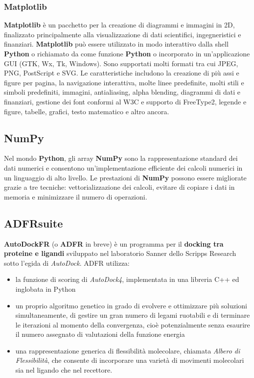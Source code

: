 \subsubsection{Matplotlib}
\textbf{Matplotlib} è un pacchetto per la creazione di diagrammi e immagini in 2D, finalizzato principalmente alla visualizzazione di dati scientifici, ingegneristici e finanziari. \textbf{Matplotlib} può essere utilizzato in modo interattivo dalla shell \textbf{Python} o richiamato da come funzione \textbf{Python} o incorporato in un'applicazione GUI (GTK, Wx, Tk, Windows). Sono supportati molti formati tra cui JPEG, PNG, PostScript e SVG. Le caratteristiche includono la creazione di più assi e figure per pagina, la navigazione interattiva, molte linee predefinite, molti stili e simboli predefiniti, immagini, antialiasing, alpha blending, diagrammi di dati e finanziari, gestione dei font conformi al W3C e supporto di FreeType2, legende e figure, tabelle, grafici, testo matematico e altro ancora\cite{barrett2005matplotlib}.

\subsection{NumPy}
Nel mondo \textbf{Python}, gli array \textbf{NumPy} sono la rappresentazione standard dei dati numerici e consentono un'implementazione efficiente dei calcoli numerici in un linguaggio di alto livello. Le prestazioni di \textbf{NumPy} possono essere migliorate grazie a tre tecniche: vettorializzazione dei calcoli, evitare di copiare i dati in memoria e minimizzare il numero di operazioni\cite{van2011numpy}.

\subsection{ADFRsuite}
\textbf{AutoDockFR} (o \textbf{ADFR} in breve) è un programma per il \textbf{docking tra proteine e ligandi} sviluppato nel laboratorio Sanner dello Scripps Research sotto l'egida di \textit{AutoDock}.\newline
ADFR utilizza:

\begin{itemize}
    \item la funzione di scoring di \textit{AutoDock4}, implementata in una libreria C++ ed inglobata in Python
    \item un proprio algoritmo genetico in grado di evolvere e ottimizzare più soluzioni simultaneamente, di gestire un gran numero di legami ruotabili e di terminare le iterazioni al momento della convergenza, cioè potenzialmente senza esaurire il numero assegnato di valutazioni della funzione energia
    \item una rappresentazione generica di flessibilità molecolare, chiamata \textit{Albero di Flessibilità}, che consente di incorporare una varietà di movimenti molecolari sia nel ligando che nel recettore.
\end{itemize}

